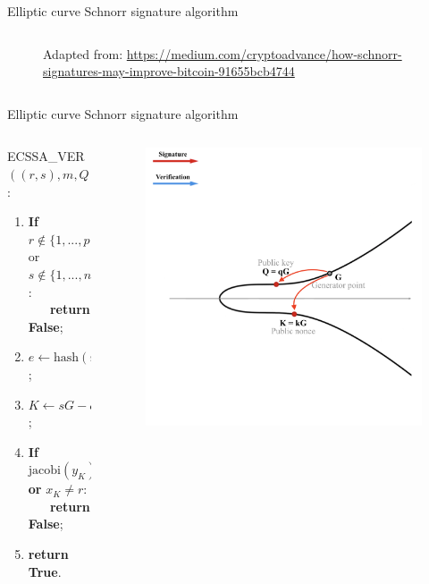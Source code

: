\documentclass[slidescentered]{beamer}
\newcommand{\source}[1]{\caption*{\tiny Adapted from: {#1}} }
\begin{document}
\begin{frame}{Elliptic curve Schnorr signature algorithm}
\begin{columns}
\begin{column}{0.5\linewidth}
\begin{figure}
{						\source{\tiny \url{https://medium.com/cryptoadvance/how-schnorr-signatures-may-improve-bitcoin-91655bcb4744}}}
				\end{figure}
			\end{column}
		\end{columns}
	\end{frame}

	\begin{frame}{Elliptic curve Schnorr signature algorithm}
		\begin{columns}
			\begin{column}{0.6\linewidth}
				ECSSA\_VER$((r, s), m, Q)$:
				\begin{enumerate}
					\item<2 -> \textbf{If} $r \notin \{1, ..., p - 1\}$ or $s \notin \{1, ..., n - 1\}$: \\ \textbf{\ \ \ return False};
					\item<3 -> $e \gets \text{hash}(r || Q || m) \ (\text{mod} \ n)$;
					\item<4 -> $K \gets sG - eQ$;
					\item<8 -> \textbf{If} $\text{jacobi}(y_K) \neq 1$ \textbf{or} $x_K \neq r$: \\ \textbf{\ \ \ return False};
					\item<9 -> \textbf{return True}.
				\end{enumerate}
			\end{column}
			\begin{column}{0.5\linewidth}
				\begin{figure}
					 {\vspace*{-0.7cm}
						\hspace*{-0.9cm}
						\includegraphics[scale=0.28]{images/Schnorr3}
}
\end{figure}
\end{column}
\end{columns}
\end{frame}
\end{document}
